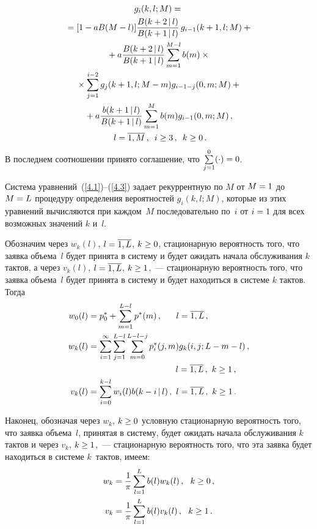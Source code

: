 \begin{multicols}{2}
\vspace*{-12pt}

\noindent
\begin{multline}
\label{4.3}
g_i(k,l;M) ={}\\
{}= [1 - a B(M-l)] \displaystyle\frac{\displaystyle B(k+2\,|\,l) \mathstrut}{\displaystyle  B(k+1\,|\,l)\mathstrut}
\, g_{i-1}(k+1,l;M)  +{}
\\
{}+
a \displaystyle\frac{\displaystyle B(k+2\,|\,l) \mathstrut}{\displaystyle  B(k+1\,|\,l)\mathstrut} \sum\limits_{m=1}^{M-l}
b(m) \times{}\\
{}\times
\sum\limits_{j=1}^{i-2} g_{j}(k+1,l;M-m)
g_{i-1-j}(0,m;M)  +{}\\
{}+
a \displaystyle\frac{\displaystyle b(k+1\,|\,l) \mathstrut}{\displaystyle  B(k+1\,|\,l)\mathstrut} \sum\limits_{m=1}^M
b(m) g_{i-1}(0,m;M)\,,\\
\  l= \overline{1,M}\,,\enskip  i\ge 3\,,\enskip  k\ge 0\,.
\end{multline}
В последнем соотношении принято соглашение, что
$\sum\limits_{j=1}^{0} (\cdot) \hm= 0$.

Система уравнений~(\ref{4.1})--(\ref{4.3}) задает
рекуррентную по $M$ от $M\hm=1$ до $M\hm=L$ процедуру
определения вероятностей $g_i(k,l;M)$, которые из этих уравнений
вычисляются при каждом~$M$ последовательно по~$i$ от
$i\hm=1$ для всех возможных значений $k$ и~$l$.

Обозначим через
$w_k(l)$, $l\hm= \overline{1,L}$, $k\hm\ge 0$,
стационарную вероятность того, что заявка объема~$l$
будет принята в систему и будет ожидать начала
обслуживания $k$ тактов,
а через $v_k(l)$, $l\hm= \overline{1,L}$, $k\hm\ge 1$,~---
стационарную вероятность того, что заявка объема~$l$
будет принята в систему и будет находиться в сис\-те\-ме
$k$ тактов. Тогда
\begin{align*}
w_0(l) &= p^*_0 + \sum\limits_{m=1}^{L-l} p^*(m)\,,\quad\ \ l= \overline{1,L}\,,
\\
w_k(l) &= \sum_{i=1}^{\infty} \sum\limits_{j=1}^{L-l} \sum\limits_{m=0}^{L-l-j} p^*_{i}(j,m) 
g_{k}(i,j;L-m-l)\,,\\
&\hspace*{36mm}  l= \overline{1,L}\,,\  k\ge 1\,,
\\
v_k(l) &= \sum\limits_{i=0}^{k-l} w_i(l) b(k-i\,|\,l) \,,\  l= \overline{1,L}\,,\  k\ge 1\,.
\end{align*}

Наконец, обозначая через $w_k$, $k\hm\ge 0$ условную
стационарную вероятность того, что заявка объема~$l$,
принятая в сис\-те\-му, будет ожидать начала обслуживания $k$ тактов
и через $v_k$, $k\hm\ge 1$,~--- стационарную вероятность
того, что эта заявка будет находиться в сис\-те\-ме $k$~тактов, имеем:
\begin{align*}
w_k&= \displaystyle\frac{\displaystyle 1\mathstrut}{\displaystyle \pi\mathstrut} \sum\limits_{l=1}^{L} b(l) w_{k}(l) \,,\ \ k\ge 0\,,
\\
v_k &= \displaystyle\frac{\displaystyle 1\mathstrut}{\displaystyle \pi\mathstrut} \sum\limits_{l=1}^{L} b(l) v_k(l) \,,\ \ k\ge 1\,.
\end{align*}


\end{multicols}
